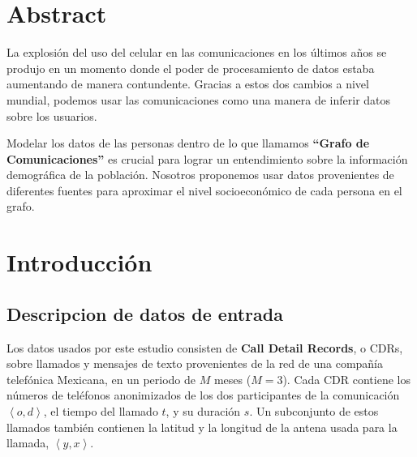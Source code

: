 \documentclass{article}
\begin{document}
\section{Abstract}

La explosi\'on del uso del celular en las comunicaciones en los \'ultimos a\~nos se produjo en un momento donde el poder de procesamiento de datos estaba aumentando de manera contundente. Gracias a estos dos cambios a nivel mundial, podemos usar las comunicaciones como una manera de inferir datos sobre los usuarios.

Modelar los datos de las personas dentro de lo que llamamos \textbf{``Grafo de Comunicaciones''} es crucial para lograr un entendimiento sobre la informaci\'on demogr\'afica de la poblaci\'on. Nosotros proponemos usar datos provenientes de diferentes fuentes para aproximar el nivel socioecon\'omico de cada persona en el grafo.

\section{Introducci\'on}


\subsection{Descripcion de datos de entrada}

Los datos usados por este estudio consisten de \textbf{Call Detail Records}, o CDRs, sobre llamados y mensajes de texto provenientes de la red de una compa\~n\'ia telef\'onica Mexicana, en un periodo de \( M \) meses (\( M = 3 \)). Cada CDR contiene los n\'umeros de tel\'efonos anonimizados de los dos participantes de la comunicaci\'on \(\left<o, d\right>\), el tiempo del llamado \(t\), y su duraci\'on \(s\). Un subconjunto de estos llamados tambi\'en contienen la latitud y la longitud de la antena usada para la llamada, \(\left<y, x\right>\).
\end{document}

